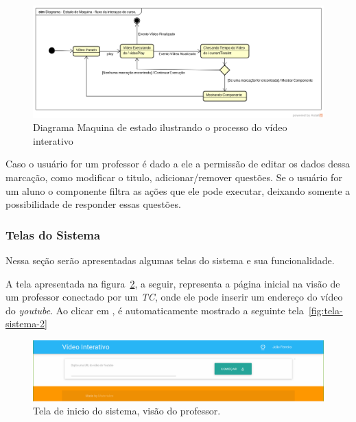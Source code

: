 \begin{figure}[H]
    \centering
    \includegraphics[keepaspectratio=true,scale=0.43]{figuras/diagrama_estado_maquina.png}
    \caption{Diagrama Maquina de estado ilustrando o processo do vídeo interativo}
    \label{fig:diagrama-maquina-estado}
\end{figure}

Caso o usuário for um professor é dado a ele a permissão de editar os dados dessa marcação, como modificar o titulo, adicionar/remover questões. Se o usuário for um aluno o componente filtra as ações que ele pode executar, deixando somente a possibilidade de responder essas questões.

\subsubsection{Telas do Sistema}

Nessa seção serão apresentadas algumas telas do sistema e sua funcionalidade.

A tela apresentada na figura~\ref{fig:tela-sistema-1}, a seguir, representa a página inicial na visão de um professor conectado por um \textit{TC}, onde ele pode inserir um endereço do vídeo do \textit{youtube}. Ao clicar em , é automaticamente mostrado a seguinte tela~\ref{fig:tela-sistema-2}

\begin{figure}[h]
    \centering
    \includegraphics[keepaspectratio=true,scale=0.31]{figuras/tela_sistema_1.png}
    \caption{Tela de inicio do sistema, visão do professor.}
    \label{fig:tela-sistema-1}
\end{figure}


